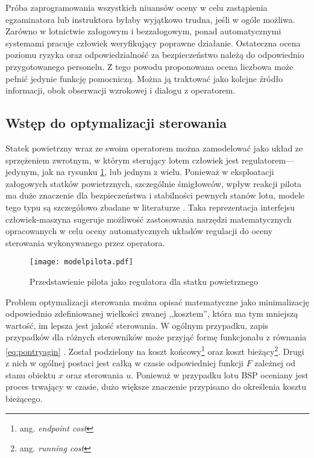 Próba zaprogramowania wszystkich niuansów oceny w celu zastąpienia egzaminatora lub instruktora byłaby wyjątkowo trudna, jeśli w ogóle możliwa. Zarówno w lotnictwie załogowym i bezzałogowym, ponad automatycznymi systemami pracuje człowiek weryfikujący poprawne działanie. Ostateczna ocena poziomu ryzyka oraz odpowiedzialność za bezpieczeństwo należą do odpowiednio przygotowanego personelu. Z tego powodu proponowana ocena liczbowa może pełnić jedynie funkcję pomocniczą. Można ją traktować jako kolejne źródło informacji, obok obserwacji wzrokowej i dialogu z operatorem.

\subsection{Wstęp do optymalizacji sterowania}
\label{sec:ocena-teoria}
Statek powietrzny wraz ze swoim operatorem można zamodelować jako układ ze sprzężeniem zwrotnym, w którym sterujący lotem człowiek jest regulatorem---jedynym, jak na rysunku \ref{fig:modelpilota}, lub jednym z wielu. Ponieważ w eksploatacji załogowych statków powietrznych, szczególnie śmigłowców, wpływ reakcji pilota ma duże znaczenie dla bezpieczeństwa i stabilności pewnych stanów lotu, modele tego typu są szczegółowo zbadane w literaturze \cite{roskam1998}. Taka reprezentacja interfejsu człowiek-maszyna sugeruje możliwość zastosowania narzędzi matematycznych opracowanych w celu oceny automatycznych układów regulacji do oceny sterowania wykonywanego przez operatora.

\begin{figure}[!h]
    \centering \texttt{[image: modelpilota.pdf]}
    \caption{Przedstawienie pilota jako regulatora dla statku powietrznego}
    \label{fig:modelpilota}
\end{figure}

Problem optymalizacji sterowania można opisać matematyczne jako minimalizację odpowiednio zdefiniowanej wielkości zwanej ,,kosztem'', która ma tym mniejszą wartość, im lepsza jest jakość sterowania. W ogólnym przypadku, zapis przypadków dla różnych sterowników może przyjąć formę funkcjonału z równania \ref{eq:pontryagin} \cite{ross2009}. Został podzielony na koszt końcowy\footnote{ang. \emph{endpoint cost}} oraz koszt bieżący\footnote{ang. \emph{running cost}}. Drugi z nich w ogólnej postaci jest całką w czasie odpowiedniej funkcji $ F $ zależnej od stanu obiektu $ x $ oraz sterowania $ u $. Ponieważ w przypadku lotu BSP oceniany jest proces trwający w czasie, dużo większe znaczenie przypisano do określenia kosztu bieżącego.

